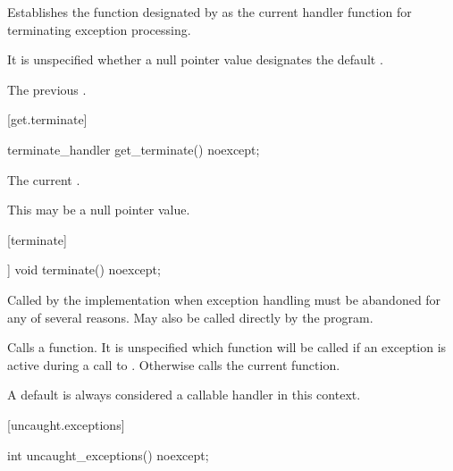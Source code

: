 \begin{itemdescr}
\pnum
\effects
Establishes the function designated by  as the current
handler function for terminating exception processing.

\pnum
\remarks It is unspecified whether a null pointer value designates the default
.

\pnum
\returns
The previous .
\end{itemdescr}

[get.terminate]{}

%
\begin{itemdecl}
terminate_handler get_terminate() noexcept;
\end{itemdecl}

\begin{itemdescr}
\pnum
\returns The current .
\begin{note} This may be a null pointer value. \end{note}
\end{itemdescr}

[terminate]{}

%
\begin{itemdecl}
[[noreturn]] void terminate() noexcept;
\end{itemdecl}

\begin{itemdescr}
\pnum
\remarks
Called by the implementation when exception
handling must be abandoned for any of several reasons.
May also be called directly by the program.

\pnum
\effects
Calls a  function. It is unspecified which
 function will be called if an exception is active
during a call to .
Otherwise calls the current  function. \begin{note} A
default  is always considered a callable handler in
this context. \end{note}
\end{itemdescr}

[uncaught.exceptions]{}

%
\begin{itemdecl}
int uncaught_exceptions() noexcept;
\end{itemdecl}


